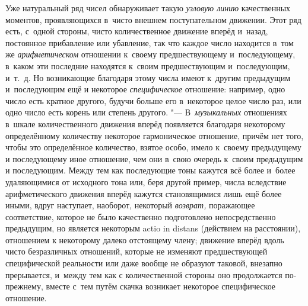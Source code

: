 Уже натуральный ряд чисел обнаруживает такую {\em узловую линию} качественных
моментов, проявляющихся в~чисто внешнем поступательном движении. Этот ряд есть,
с~одной стороны, чисто количественное движение вперёд и~назад, постоянное
прибавление или убавление, так что каждое число находится в~том же
{\em арифметическом} отношении к~своему предшествующему и~последующему, в~каком
эти последние находятся к~своим предшествующим и~последующим, и~т.~д. Но
возникающие благодаря этому числа имеют к~другим предыдущим и~последующим ещё и
некоторое {\em специфическое} отношение: например, одно число есть кратное
другого, будучи больше его в~некоторое целое число раз, или одно число есть
корень или степень другого. "--- В~{\em музыкальных} отношениях в~шкале
количественного движения вперёд появляется благодаря некоторому определённому
количеству некоторое гармоническое отношение, причём нет того, чтобы это
определённое количество, взятое особо, имело к~своему предыдущему и
последующему иное отношение, чем они в~свою очередь к~своим предыдущим и
последующим. Между тем как последующие тоны кажутся всё более и~более
удаляющимися от исходного тона или, беря другой пример, числа вследствие
арифметического движения вперёд кажутся становящимися лишь ещё более иными,
вдруг наступает, наоборот, некоторый {\em возврат,} поражающее соответствие,
которое не было качественно подготовлено непосредственно предыдущим, но
является некоторым actio in distans (действием на расстоянии), отношением к
некоторому далеко отстоящему члену; движение вперёд вдоль чисто безразличных
отношений, которые не изменяют предшествующей специфической реальности или даже
вообще не образуют таковой, внезапно прерывается, и~между тем как с
количественной стороны оно продолжается по-прежнему, вместе с~тем путём скачка
возникает некоторое специфическое отношение.

